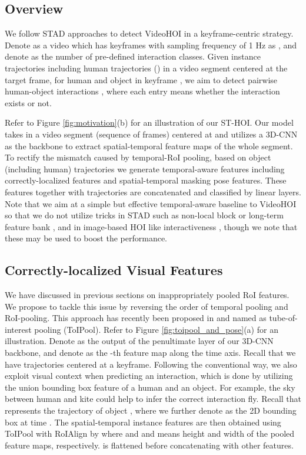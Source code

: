 \documentclass[sigconf]{acmart}
\begin{document}
\subsection{Overview}
\label{subsec:overview}
We follow STAD approaches \cite{tran2015learning,carreira2017quo,feichtenhofer2019slowfast} to detect VideoHOI in a keyframe-centric strategy. 
Denote  as a video which has  keyframes with sampling frequency of 1 Hz as , and denote  as the number of pre-defined interaction classes.
Given  instance trajectories including  human trajectories () in a video segment centered at the target frame, for human  and object  in keyframe , we aim to detect pairwise human-object interactions , where each entry  means whether the interaction  exists or not.

Refer to Figure \ref{fig:motivation}(b) for an illustration of our ST-HOI.
Our model takes in a video segment (sequence of  frames) centered at  and utilizes a 3D-CNN as the backbone to extract spatial-temporal feature maps of the whole segment.
To rectify the mismatch caused by temporal-RoI pooling, based on  object (including human) trajectories  we generate temporal-aware features including correctly-localized features and spatial-temporal masking pose features.
These features together with trajectories are concatenated and classified by linear layers.
Note that we aim at a simple but effective temporal-aware baseline to VideoHOI so that we do not utilize tricks in STAD such as non-local block \cite{wang2018non} or long-term feature bank \cite{wu2019long}, and in image-based HOI like interactiveness \cite{li2019transferable}, though we note that these may be used to boost the performance.


\subsection{Correctly-localized Visual Features}
\label{subsec:temporal_visual_features}

We have discussed in previous sections on inappropriately pooled RoI features.
We propose to tackle this issue by reversing the order of temporal pooling and RoI-pooling.
This approach has recently been proposed in \cite{hou2017tube} and named as tube-of-interest pooling (ToIPool).
Refer to Figure \ref{fig:toipool_and_pose}(a) for an illustration.
Denote  as the output of the penultimate layer of our 3D-CNN backbone, and denote  as the -th feature map along the time axis.
Recall that we have  trajectories centered at a keyframe.
Following the conventional way, we also exploit visual context when predicting an interaction, which is done by utilizing the union bounding box feature of a human and an object.
For example, the sky between {\selectfont human} and {\selectfont kite} could help to infer the correct interaction {\selectfont fly}.
Recall that  represents the trajectory of object , where we further denote  as the 2D bounding box at time .
The spatial-temporal instance features  are then obtained using ToIPool with RoIAlign \cite{he2017mask} by 
where  and  and  means height and width of the pooled feature maps, respectively. 
 is flattened before concatenating with other features.
\end{document}
